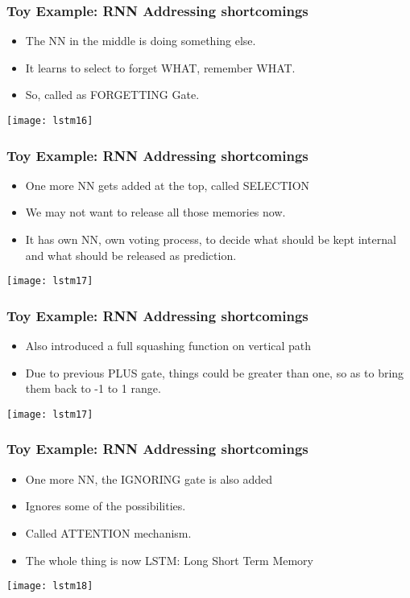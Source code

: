 \begin{frame}[fragile] \frametitle{Toy Example: RNN Addressing shortcomings}
\begin{itemize}
\item The NN in the middle is doing something else.
\item It learns to select to forget WHAT, remember WHAT. 
\item So, called as FORGETTING Gate.
\end{itemize}
\begin{center}
\texttt{[image: lstm16]}
\end{center}
\end{frame}


\begin{frame}[fragile] \frametitle{Toy Example: RNN Addressing shortcomings}
\begin{itemize}
\item One more NN gets added at the top, called SELECTION
\item We may not want to release all those memories now.
\item It has own NN, own voting process, to decide what should be kept internal and what should be released as prediction.
\end{itemize}
\begin{center}
\texttt{[image: lstm17]}
\end{center}
\end{frame}

\begin{frame}[fragile] \frametitle{Toy Example: RNN Addressing shortcomings}
\begin{itemize}
\item Also introduced a full squashing function on vertical path
\item Due to previous PLUS gate, things could be greater than one, so as to bring them back to -1 to 1 range.
\end{itemize}
\begin{center}
\texttt{[image: lstm17]}
\end{center}
\end{frame}

\begin{frame}[fragile] \frametitle{Toy Example: RNN Addressing shortcomings}
\begin{itemize}
\item One more NN, the IGNORING gate is also added
\item Ignores some of the  possibilities. 
\item Called ATTENTION mechanism.
\item The whole thing is now LSTM: Long Short Term Memory
\end{itemize}
\begin{center}
\texttt{[image: lstm18]}
\end{center}
\end{frame}

